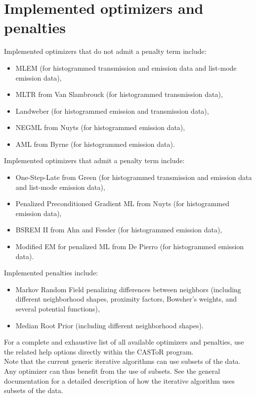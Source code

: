 \documentclass[a4paper, 11pt]{article}
\begin{document}
\section{Implemented optimizers and penalties}

Implemented optimizers that do not admit a penalty term include:
\begin{itemize}
  \item MLEM (for histogrammed transmission and emission data and list-mode emission data),
  \item MLTR from Van Slambrouck (for histogrammed transmission data),
  \item Landweber (for histogrammed emission and transmission data),
  \item NEGML from Nuyts (for histogrammed emission data),
  \item AML from Byrne (for histogrammed emission data).
\end{itemize}
Implemented optimizers that admit a penalty term include:
\begin{itemize}
  \item One-Step-Late from Green (for histogrammed transmission and emission data and list-mode emission data),
  \item Penalized Preconditioned Gradient ML from Nuyts (for histogrammed emission data),
  \item BSREM II from Ahn and Fessler (for histogrammed emission data),
  \item Modified EM for penalized ML from De Pierro (for histogrammed emission data).
\end{itemize}
Implemented penalties include:
\begin{itemize}
  \item Markov Random Field penalizing differences between neighbors (including different neighborhood shapes, proximity factors, Bowsher's weights, and several potential functions),
  \item Median Root Prior (including different neighborhood shapes).
\end{itemize}

For a complete and exhaustive list of all available optimizers and penalties, use the related help options directly within the CASToR program.\\

Note that the current generic iterative algorithms can use subsets of the data.
Any optimizer can thus benefit from the use of subsets.
See the general documentation for a detailed description of how the iterative algorithm uses subsets of the data.
\end{document}
